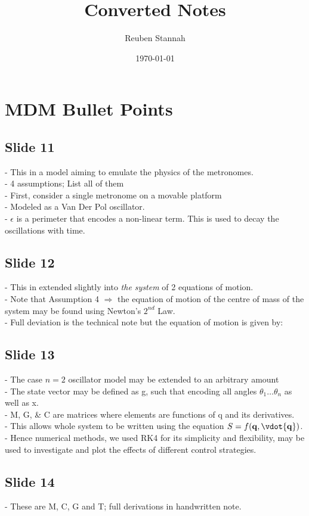 \documentclass[12pt, a4paper]{article}
\title{Converted Notes}
\author{Reuben Stannah}
\date{\today}
\begin{document}
\maketitle
\section{MDM Bullet Points}
\subsection{Slide 11}
- This in a model aiming to emulate the physics of the metronomes. \\
- 4 assumptions; List all of them \\
- First, consider a single metronome on a movable platform \\
- Modeled as a Van Der Pol oscillator. \\
- $\epsilon$ is a perimeter that encodes a non-linear term. This is used to decay the oscillations with time. \\


\subsection{Slide 12}
- This in extended slightly into \textit{the system} of 2 equations of motion. \\
- Note that Assumption 4 $\Rightarrow$ the equation of motion of the centre of mass of the system may be found using Newton's $2^{nd}$ Law. \\
- Full deviation is the technical note but the equation of motion is given by:

\subsection{Slide 13}

- The case \( n=2 \) oscillator model may be extended to an arbitrary amount \\
- The state vector may be defined as g, such that encoding all angles $\theta_1 \dots \theta_n$ as well as x. \\
- M, G, \& C are matrices where elements are functions of q and its derivatives. \\
- This allows whole system to be written using the equation \( S = f(\mathbf{q}, \vdot{\mathbf{q}}) \). \\
- Hence numerical methods, we used RK4 for its simplicity and flexibility, may be used to investigate and plot the effects of different control strategies. \\

\subsection{Slide 14}

- These are M, C, G and T; full derivations in handwritten note. \\
\end{document}
